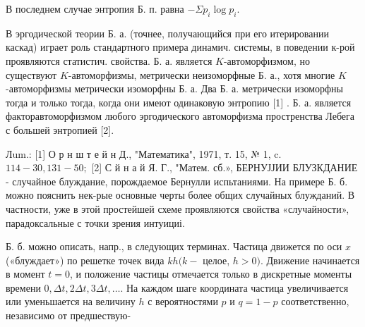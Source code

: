 \documentclass[10pt]{article}
\begin{document}
В последнем случае энтропия Б. п. равна $-\Sigma p_{i} \log p_{i}$.



В эргодической теории Б. а. (точнее, получающийся при его итерировании каскад) играет роль стандартного примера динамич. системы, в поведении к-рой проявляются статистич. свойства. Б. а. является $K$-автоморфизмом, но существуют $K$-автоморфизмы, метрически неизоморфные Б. а., хотя многие $K$-автоморфизмы метрически изоморфны Б. а. Два Б. а. метрически изоморфны тогда и только тогда, когда они имеют одинаковую энтропию [1] . Б. а. является факторавтоморфизмом любого эргодического автоморфизма простренства Лебега с большей энтропией [2].



Лum.: [1] О р н ш т е й н Д., "Математика", 1971, т. 15, № 1, c. $114-30,131-50 ;$ [2] С й н а й Я. Г., "Матем. сб.», БЕРНУЈЈИИ БЛУЗКДАНИЕ - случайное блуждание, порождаемое Бернулли испьтаниями. На примере Б. б. можно пояснить нек-рые основные черты более общих случайных блужданий. В частности, уже в этой простейшей схеме проявляются свойства «случайности», парадоксальные с точки зрения интуициі.



Б. б. можно описать, напр., в следующих терминах. Частица движется по оси $x$ («блуждает») по решетке точек вида $k h(k-$ целое, $h>0)$. Движение начинается в момент $t=0$, и положение частицы отмечается только в дискретные моменты времени $0, \Delta t, 2 \Delta t, 3 \Delta t, \ldots$. На каждом шаге координата частица увеличивается или уменьшается на величину $h$ с вероятностями $p$ и $q=1-p$ соответственно, независимо от предшествую-
\end{document}
